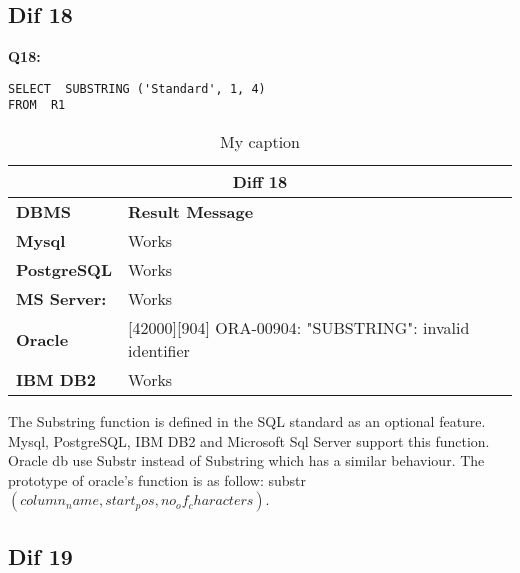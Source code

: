 \subsection{Dif 18}

\begin{mdframed}[backgroundcolor=lightgray!20] 
\textbf{Q18:}
\begin{lstlisting}
SELECT  SUBSTRING ('Standard', 1, 4)
FROM  R1
\end{lstlisting}
\end{mdframed} 

\begin{table}[h]
\centering
\caption{My caption}
\label{my-label}
\begin{tabular}{|p{2cm}|p{12cm}|}
\hline
\multicolumn{2}{|c|}{\textbf{Diff 18}}                                                                       \\ \hline
\textbf{DBMS}                              & \textbf{Result Message}                                         \\ \hline
{\color[HTML]{333333} \textbf{Mysql}}      & {\color[HTML]{333333} Works}                                    \\ \hline
{\color[HTML]{333333} \textbf{PostgreSQL}} & {\color[HTML]{333333} Works}                                    \\ \hline
{\color[HTML]{333333} \textbf{MS Server:}} & {\color[HTML]{333333} Works}                                    \\ \hline
\textbf{Oracle}                            & {[}42000{]}{[}904{]} ORA-00904: "SUBSTRING": invalid identifier \\ \hline
\textbf{IBM DB2}                           & Works                                                           \\ \hline
\end{tabular}
\end{table}

The Substring function is defined in the SQL standard as an optional feature. Mysql, PostgreSQL, IBM DB2 and Microsoft Sql Server support this function. Oracle db use Substr instead of Substring which has a similar behaviour. The prototype of oracle’s function is as follow: substr $(column_name, start_pos , no_of_characters)$. 


\subsection{Dif 19}

